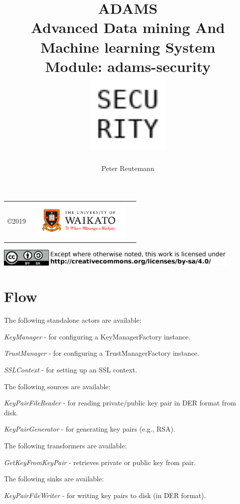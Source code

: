 \documentclass[a4paper]{book}
\title{
  \textbf{ADAMS} \\
  {\Large \textbf{A}dvanced \textbf{D}ata mining \textbf{A}nd \textbf{M}achine
  learning \textbf{S}ystem} \\
  {\Large Module: adams-security} \\
  \vspace{1cm}
  \includegraphics[width=4cm]{images/security-module.png} \\
}
\author{
  Peter Reutemann
}
\begin{document}
\begin{titlepage}
\maketitle

\thispagestyle{empty}
\center
\begin{table}[b]
	\begin{tabular}{c l l}
		\parbox[c][2cm]{2cm}{\copyright 2019} &
		\parbox[c][2cm]{5cm}{\includegraphics[width=5cm]{images/coat_of_arms.pdf}} \\
	\end{tabular}
	\includegraphics[width=12cm]{images/cc.png} \\
\end{table}

\end{titlepage}

\tableofcontents

\chapter{Flow}
\noindent The following standalone actors are available:
\begin{tight_itemize}
  \item \textit{KeyManager} - for configuring a KeyManagerFactory instance.
  \item \textit{TrustManager} - for configuring a TrustManagerFactory instance.
  \item \textit{SSLContext} - for setting up an SSL context.
\end{tight_itemize}

\noindent The following sources are available:
\begin{tight_itemize}
  \item \textit{KeyPairFileReader} - for reading private/public key pair in
  DER format from disk.
  \item \textit{KeyPairGenerator} - for generating key pairs (e.g., RSA).
\end{tight_itemize}

\noindent The following transformers are available:
\begin{tight_itemize}
  \item \textit{GetKeyFromKeyPair} - retrieves private or public key from pair.
\end{tight_itemize}

\noindent The following sinks are available:
\begin{tight_itemize}
  \item \textit{KeyPairFileWriter} - for writing key pairs to disk (in DER format).
\end{tight_itemize}


\end{document}
